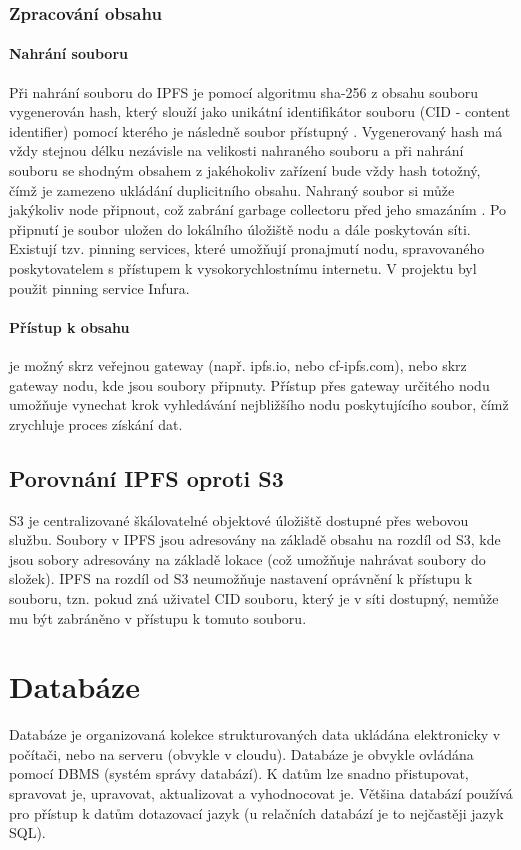 \documentclass[12pt, a4paper,
 twoside,        %
 openright
]{report}
\begin{document}
\subsubsection{Zpracování obsahu}
\paragraph{Nahrání souboru}
Při nahrání souboru do IPFS je pomocí algoritmu sha-256 z obsahu souboru vygenerován hash, který slouží jako unikátní identifikátor souboru (CID - content identifier) pomocí kterého je následně soubor přístupný \cite{IPFScontentAddressing}. Vygenerovaný hash má vždy stejnou délku nezávisle na velikosti nahraného souboru a při nahrání souboru se shodným obsahem z jakéhokoliv zařízení bude vždy hash totožný, čímž je zamezeno ukládání duplicitního obsahu. Nahraný soubor si může jakýkoliv node připnout, což zabrání garbage collectoru před jeho smazáním \cite{IPFSPersistence}. Po připnutí je soubor uložen do lokálního úložiště nodu a dále poskytován síti. Existují tzv. pinning services, které umožňují pronajmutí nodu, spravovaného poskytovatelem s přístupem k vysokorychlostnímu internetu. V projektu byl použit pinning service Infura.
\paragraph{Přístup k obsahu} je možný skrz veřejnou gateway (např. ipfs.io, nebo cf-ipfs.com), nebo skrz gateway nodu, kde jsou soubory připnuty. Přístup přes gateway určitého nodu umožňuje vynechat krok vyhledávání nejbližšího nodu poskytujícího soubor, čímž zrychluje proces získání dat. \cite{IPFSgateways}
\subsection{Porovnání IPFS oproti S3}
S3 je centralizované škálovatelné objektové úložiště dostupné přes webovou službu. Soubory v IPFS jsou adresovány na základě obsahu na rozdíl od S3, kde jsou sobory adresovány na základě lokace (což umožňuje nahrávat soubory do složek). IPFS na rozdíl od S3 neumožňuje nastavení oprávnění k přístupu k souboru, tzn. pokud zná uživatel CID souboru, který je v síti dostupný, nemůže mu být zabráněno v přístupu k tomuto souboru. \cite{whatIsS3}

\section{Databáze}
Databáze je organizovaná kolekce strukturovaných data ukládána elektronicky v počítači, nebo na serveru (obvykle v cloudu). Databáze je obvykle ovládána pomocí DBMS (systém správy databází). K datům lze snadno přistupovat, spravovat je, upravovat, aktualizovat a vyhodnocovat je. Většina databází používá pro přístup k datům dotazovací jazyk (u relačních databází je to nejčastěji jazyk SQL). \cite{whatIsDatabase}
\end{document}

